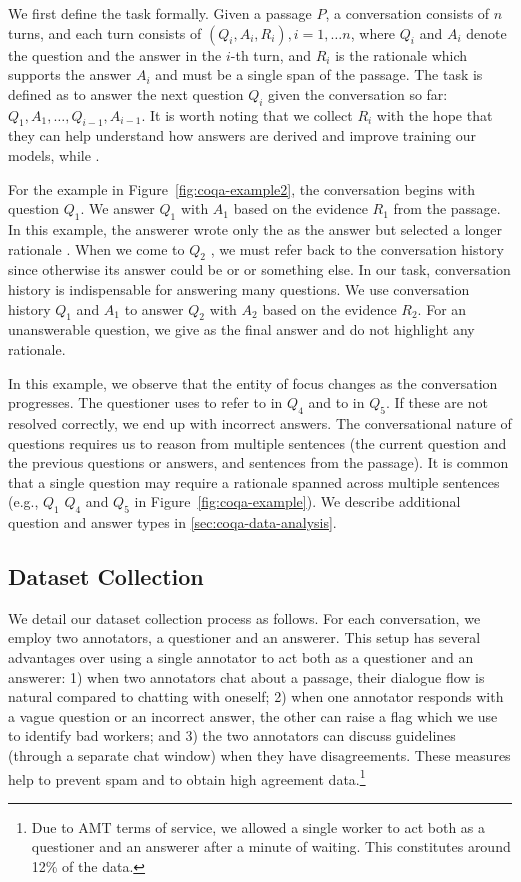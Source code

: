 We first define the task formally. Given a passage $P$, a conversation consists of $n$ turns, and each turn consists of $(Q_i, A_i, R_i), i = 1, \ldots n$, where $Q_i$ and $A_i$ denote the question and the answer in the $i$-th turn, and $R_i$ is the rationale which supports the answer $A_i$ and must be a single span of the passage. The task is defined as to answer the next question $Q_i$ given the conversation so far: $Q_1, A_1, \ldots, Q_{i -1}, A_{i - 1}$. It is worth noting that we collect $R_i$ with the hope that they can help understand how answers are derived and improve training our models, while .

For the example in Figure~\ref{fig:coqa-example2}, the conversation begins with question $Q_1$. We answer $Q_1$ with $A_1$ based on the evidence $R_1$ from the passage. In this example, the answerer wrote only the  as the answer but selected a longer rationale . When we come to $Q_2$ , we must refer back to the conversation history since otherwise its answer could be  or  or something else. In our task, conversation history is indispensable for answering many questions. We use conversation history $Q_1$ and $A_1$ to answer $Q_2$ with $A_2$ based on the evidence $R_2$.  For an unanswerable question, we give  as the final answer and do not highlight any rationale.

In this example, we observe that the entity of focus changes as the conversation progresses. The questioner uses  to refer to  in $Q_4$ and  to  in $Q_5$. If these are not resolved correctly, we end up with incorrect answers. The conversational nature of questions requires us to reason from multiple sentences (the current question and the previous questions or answers, and sentences from the passage). It is common that a single question may require a rationale spanned across multiple sentences (e.g., $Q_1$ $Q_4$ and $Q_5$ in Figure~\ref{fig:coqa-example}). We describe additional question and answer types in \ref{sec:coqa-data-analysis}.


\subsection{Dataset Collection}
We detail our dataset collection process as follows. For each conversation, we employ two annotators, a questioner and an answerer. This setup has several advantages over using a single annotator to act both as a questioner and an answerer:
1) when two annotators chat about a passage, their dialogue flow is natural compared to chatting with oneself; 2) when one annotator responds with a vague question or an incorrect answer, the other can raise a flag which we use to identify bad workers; and 3) the two annotators can discuss guidelines (through a separate chat window) when they have disagreements. These measures help to prevent spam and to obtain high agreement data.\footnote{Due to AMT terms of service, we allowed a single worker to act both as a questioner and an answerer after a minute of waiting. This constitutes around 12\% of the data.}


